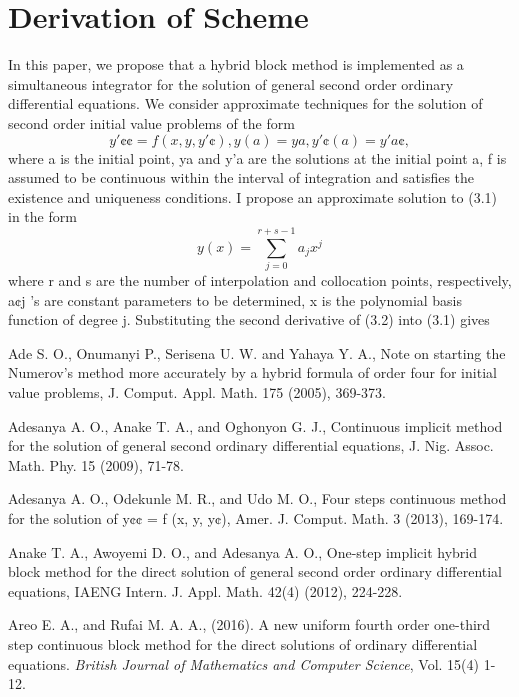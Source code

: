 \documentclass[12pt]{report}
\begin{document}
\section{Derivation of Scheme}
In this paper, we propose that a hybrid block method is implemented as a simultaneous integrator for the solution of general second order ordinary differential equations. We consider approximate techniques for the solution of second order initial value problems of the form
\begin{equation}
y'¢¢ = f (x, y, y'¢), y(a) = ya , y'¢(a) = y'a¢ ,						 		
\end{equation}
where a is the initial point, ya and y'a are the solutions at the initial point a, f is assumed to be continuous within the interval of integration and satisfies the existence and uniqueness conditions. I propose an approximate solution to (3.1) in the form
\begin{equation}
y(x) = \sum_{j=0}^{r+s-1}a_{j}x^{j}								
\end{equation}
where r and s are the number of interpolation and collocation points, respectively, a¢j ’s are constant parameters to be determined, x is the polynomial basis function of degree j.
Substituting the second derivative of (3.2) into (3.1) gives

\thebibliography{}
Ade S. O., Onumanyi P., Serisena U. W. and Yahaya Y. A., Note on starting the Numerov’s method more accurately by a hybrid formula of order four for initial value problems, J. Comput. Appl. Math. 175 (2005), 369-373.

Adesanya A. O., Anake T. A., and Oghonyon G. J., Continuous implicit method for the solution of general second ordinary differential equations, J. Nig. Assoc. Math. Phy. 15 (2009), 71-78.

 Adesanya A. O., Odekunle M. R., and Udo M. O., Four steps continuous method for the solution of y¢¢ = f (x, y, y¢), Amer. J. Comput. Math. 3 (2013), 169-174.

 Anake T. A., Awoyemi D. O., and Adesanya A. O., One-step implicit hybrid block method for the direct solution of general second order ordinary differential equations, IAENG Intern. J. Appl. Math. 42(4) (2012), 224-228.

Areo E. A., and Rufai M. A. A., (2016). A new uniform fourth order one-third step continuous block method for the direct solutions of ordinary differential equations. \textit{British Journal of Mathematics and Computer Science}, Vol. 15(4) 1-12.
\end{document}

